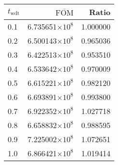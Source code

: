 \begin{tabular}{lrr}
\toprule
$t_{\mathrm{wdt}}$ & $\overline{\mathrm{FOM}}$ &    Ratio \\
\midrule
               0.1 &   6.735651$\times 10^{8}$ & 1.000000 \\
               0.2 &   6.500143$\times 10^{8}$ & 0.965036 \\
               0.3 &   6.422513$\times 10^{8}$ & 0.953510 \\
               0.4 &   6.533642$\times 10^{8}$ & 0.970009 \\
               0.5 &   6.615221$\times 10^{8}$ & 0.982120 \\
               0.6 &   6.693891$\times 10^{8}$ & 0.993800 \\
               0.7 &   6.922352$\times 10^{8}$ & 1.027718 \\
               0.8 &   6.658832$\times 10^{8}$ & 0.988595 \\
               0.9 &   7.225002$\times 10^{8}$ & 1.072651 \\
               1.0 &   6.866421$\times 10^{8}$ & 1.019414 \\
\bottomrule
\end{tabular}
